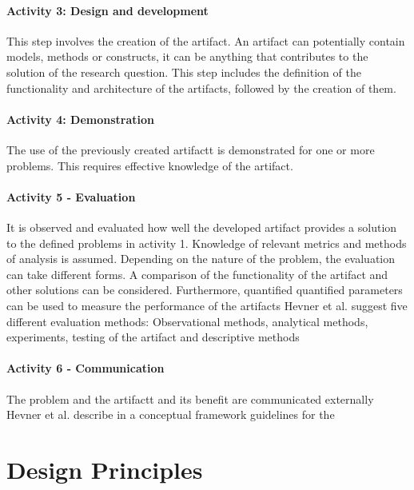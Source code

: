 \paragraph{Activity 3: Design and development} 
This step involves the creation of the artifact. An artifact can potentially contain models,
methods or constructs, it can be anything that contributes to the solution of the research question. 
This step includes the definition of the functionality and architecture of the artifacts, followed by the creation of them.
\cite[p. 55]{peffers_designscienceresearch_2007}

\paragraph{Activity 4: Demonstration} 
The use of the previously created artifactt is demonstrated for one or more problems.
This requires effective knowledge of the artifact. 
\cite[p. 55]{peffers_designscienceresearch_2007}

\paragraph{Activity 5 - Evaluation} 
It is observed and evaluated how well the developed artifact provides a solution to the defined problems in activity 1.
Knowledge of relevant metrics and methods of analysis is assumed. Depending on the nature of the problem, the evaluation can take different forms.
A comparison of the functionality of the artifact and other solutions can be considered. Furthermore, quantified
quantified parameters can be used to measure the performance of the artifacts
\cite[p. 56]{peffers_designscienceresearch_2007}
Hevner et al.  suggest five different evaluation methods: Observational
methods, analytical methods, experiments, testing of the artifact and descriptive
methods 
\cite[p. 87]{hevner_designscienceinformation_2004}

\paragraph{Activity 6 - Communication} 
The problem and the artifactt and its benefit are communicated externally 
\cite[p. 56]{peffers_designscienceresearch_2007}
Hevner et al. describe in a conceptual framework guidelines for the

\section{Design Principles} 

